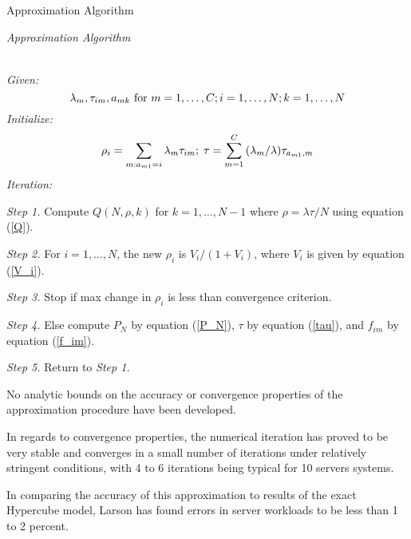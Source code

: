 \begin{frame}{Approximation Algorithm}{}
  {\footnotesize
    \begin{center}
      \textit{ Approximation Algorithm}
    \end{center}
    \vspace{-8pt}
    \hline \\
    \vspace{2pt}
    \textit{Given:}
    \begin{equation*}
      \lambda_m,\tau_{im},a_{mk}
      \mbox{ for }
      m = 1,\ldots,C;
      i=1,\ldots,N;
      k=1,\ldots,N 
      \hfill
    \end{equation*}
    \textit{Initialize:}
    \begin{equation*}
      \rho_i =
      \sum_{m: a_{m1} = i}{
        \lambda_m \tau_{im}
      }; \;
      \tau = 
      \sum_{m=1}^{C}{
        (\lambda_m/\lambda)\tau_{a_{m1},m}
      } \hfill
    \end{equation*}
    \textit{Iteration:}

    \textit{Step 1.} 
    Compute $Q(N,\rho,k)$
    for $k = 1,\ldots,N-1$
    where $\rho = \lambda \tau / N$
    using equation (\ref{Q}).

    \textit{Step 2.}
    For $i = 1,\ldots,N$,
    the new $\rho_i$ is $V_i/(1+V_i)$,
    where $V_i$ is given by equation (\ref{V_i}).

    \textit{Step 3.}
    Stop if
    max change in $\rho_i$
    is less than convergence criterion.

    \textit{Step 4.}
    Else compute $P_N$ by equation (\ref{P_N}),
    $\tau$ by equation (\ref{tau}),
    and $f_{im}$ by equation (\ref{f_im}).

    \textit{Step 5.}
    Return to \textit{Step 1.}
    \hline
  }
\end{frame}

\begin{frame}
  No analytic bounds
  on the accuracy or convergence properties
  of the approximation procedure
  have been developed.

  In regards to convergence properties,
  the numerical iteration
  has proved to be very stable
  and converges in a small number of iterations
  under relatively stringent conditions,
  with 4 to 6 iterations being typical for 10 servers systems.

  In comparing
  the accuracy of this approximation
  to results of the exact Hypercube model,
  Larson has found errors in server workloads
  to be less than 1 to 2 percent.
\end{frame}
